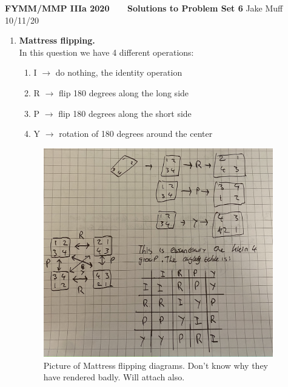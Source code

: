 \documentclass[12pt]{article}
\begin{document}
\normalsize

\baselineskip 14pt

\begin{center}
{\Large {\bf FYMM/MMP IIIa 2020 \ \ \  Solutions to Problem Set 6}}
Jake Muff
10/11/20
\end{center}

\bigskip

\noindent



\begin{enumerate}
\item {\bf Mattress flipping.}\\
In this question we have 4 different operations:
\begin{enumerate}
    \item I $\rightarrow$ do nothing, the identity operation 
    \item R $\rightarrow$ flip 180 degrees along the long side 
    \item P $\rightarrow$ flip 180 degrees along the short side 
    \item Y $\rightarrow$ rotation of 180 degrees around the center 
\end{enumerate}
\begin{figure}[h]
    \centering
    \includegraphics[width=10cm]{q1.jpg}
    \caption{Picture of Mattress flipping diagrams. Don't know why they have rendered badly. Will attach also.}
    \end{figure}


\end{enumerate}
\end{document}
